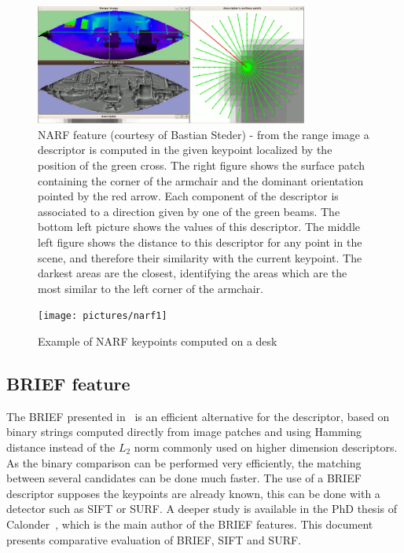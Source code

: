 \begin{figure}[H]
\centering
\includegraphics[width=0.8\textwidth]{figures/narf_descriptor_visualization}
\caption{NARF feature (courtesy of Bastian Steder) - from the range image a descriptor is computed in the given keypoint localized by the position of the green cross. The right figure shows the surface patch containing the corner of the armchair and the dominant orientation pointed by the red arrow. Each component of the descriptor is associated to a direction given by one of the green beams. The bottom left picture shows the values of this descriptor. The middle left figure shows the distance to this descriptor for any point in the scene, and therefore their similarity with the current keypoint. The darkest areas are the closest, identifying the areas which are the most similar to the left corner of the armchair.}
\end{figure}

\begin{figure}[H]
\centering
\texttt{[image: pictures/narf1]}
\caption{Example of NARF keypoints computed on a desk}
\end{figure}

\subsection{BRIEF feature}

The \gls{BRIEF} presented in~\cite{Calonder10-brief} is an efficient alternative for the descriptor, based on binary strings computed directly from image patches and using Hamming distance instead of the $L_2$ norm commonly used on higher dimension descriptors. As the binary comparison can be performed very efficiently, the matching between several candidates can be done much faster. The use of a \gls{BRIEF} descriptor supposes the keypoints are already known, this can be done with a detector such as \gls{SIFT} or \gls{SURF}. A deeper study is available in the PhD thesis of Calonder~\cite{Calonder10_PhD}, which is the main author of the \gls{BRIEF} features. This document presents comparative evaluation of \gls{BRIEF}, \gls{SIFT} and \gls{SURF}.

